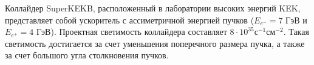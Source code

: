 Коллайдер SuperKEKB, расположенный в лаборатории высоких энергий KEK, представляет собой ускоритель с ассиметричной энергией пучков ($E_{e^-}=7$ ГэВ и $E_{e^+}=4$ ГэВ). Проектная светимость коллайдера составляет $8\cdot10^{35}$с$^{-1}$см$^{-2}$. Такая светимость достигается за счет уменьшения поперечного размера пучка, а также за счет большого угла столкновения пучков. 
